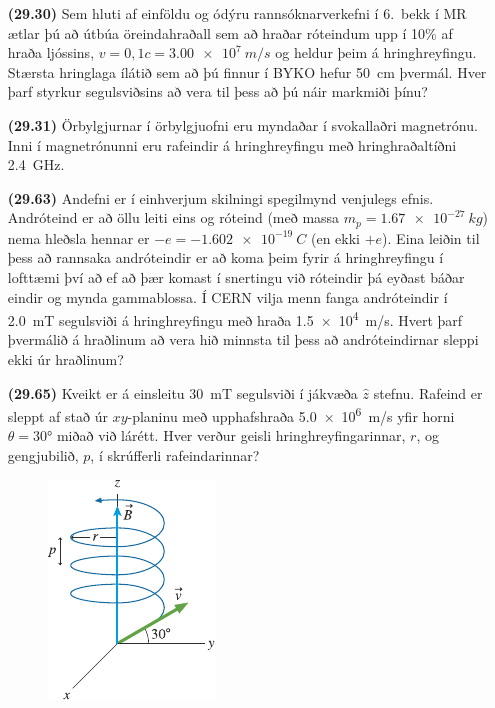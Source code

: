 \begin{enumerate}[label = \textbf{(\alph*)}]

\item[\textbf{(29.30)}] Sem hluti af einföldu og ódýru rannsóknarverkefni í 6.~bekk í MR ætlar þú að útbúa öreindahraðall sem að hraðar róteindum upp í 10\% af hraða ljóssins, $v = 0,1c = \SI{3.00e7}{m/s}$ og heldur þeim á hringhreyfingu. Stærsta hringlaga ílátið sem að þú finnur í BYKO hefur \SI{50}{cm} þvermál. Hver þarf styrkur segulsviðsins að vera til þess að þú náir markmiði þínu?

\item[\textbf{(29.31)}] Örbylgjurnar í örbylgjuofni eru myndaðar í svokallaðri magnetrónu. Inni í magnetrónunni eru rafeindir á hringhreyfingu með hringhraðaltíðni \SI{2.4}{GHz}. 


\item[\textbf{(29.63)}] Andefni er í einhverjum skilningi spegilmynd venjulegs efnis. Andróteind er að öllu leiti eins og róteind (með massa $m_p = \SI{1.67e-27}{kg}$) nema hleðsla hennar er $-e = \SI{-1.602e-19}{C}$ (en ekki $+e$). Eina leiðin til þess að rannsaka andróteindir er að koma þeim fyrir á hringhreyfingu í lofttæmi því að ef að þær komast í snertingu við róteindir þá eyðast báðar eindir og mynda gammablossa. Í CERN vilja menn fanga andróteindir í \SI{2.0}{mT} segulsviði á hringhreyfingu með hraða \SI{1.5e4}{m/s}. Hvert þarf þvermálið á hraðlinum að vera hið minnsta til þess að andróteindirnar sleppi ekki úr hraðlinum?


\item[\textbf{(29.65)}] Kveikt er á einsleitu \SI{30}{mT} segulsviði í jákvæða $\hat{z}$ stefnu. Rafeind er sleppt af stað úr $xy$-planinu með upphafshraða \SI{5.0e6}{m/s} yfir horni $\theta = \ang{30}$ miðað við lárétt. Hver verður geisli hringhreyfingarinnar, $r$, og gengjubilið, $p$, í skrúfferli rafeindarinnar?

\begin{figure}[H]
    \centering
    \includegraphics{figures/rk2965.pdf}
\end{figure}


\end{enumerate}


